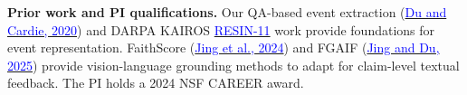 \documentclass[11pt,letterpaper]{article}
\newcommand{\head}[1]{\textbf{#1}\enspace}
\begin{document}
\par\head{Prior work and PI qualifications.} Our QA-based event extraction (\href{https://doi.org/10.18653/v1/2020.emnlp-main.49}{\textcolor{blue}{Du and Cardie, 2020}}) and DARPA KAIROS \href{https://doi.org/10.18653/v1/2022.naacl-demo.7}{\textcolor{blue}{RESIN-11}} work provide foundations for event representation. FaithScore (\href{https://aclanthology.org/2024.findings-emnlp.290/}{\textcolor{blue}{Jing et al., 2024}}) and FGAIF (\href{https://openreview.net/forum?id=Qhfw5CUVd7}{\textcolor{blue}{Jing and Du, 2025}}) provide vision-language grounding methods to adapt for claim-level textual feedback. The PI holds a 2024 NSF CAREER award.
\end{document}

